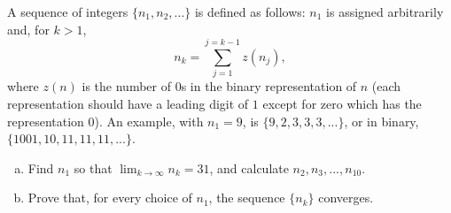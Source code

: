 A sequence of integers $\lbrace n_1, n_2, ... \rbrace$ is defined as follows:
$n_1$ is assigned arbitrarily and, for $k>1$, $$n_k=\sum_{j=1}^{j=k-1}z(n_j),$$
where $z(n)$ is the number of $0$s in the binary representation of $n$ (each
representation should have a leading digit of $1$ except for zero which has the
representation $0$). An example, with $n_1=9$, is $\lbrace 9, 2, 3, 3, 3, ...
\rbrace$, or in binary, $\lbrace 1001, 10, 11, 11, 11, ... \rbrace$.

\begin{enumerate}[(a)]
\item Find $n_1$ so that $\lim_{k \to \infty} n_k = 31$, and calculate $n_2, n_3, ... ,n_{10}$.
\item Prove that, for every choice of $n_1$, the sequence $\lbrace n_k \rbrace$ converges.
\end{enumerate}
